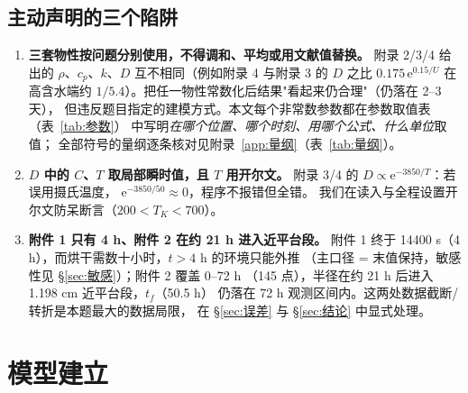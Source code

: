 \documentclass[12pt,a4paper]{ctexart}
\numberwithin{equation}{section}
\begin{document}
\subsection{主动声明的三个陷阱}
\begin{enumerate}
  \item \textbf{三套物性按问题分别使用，不得调和、平均或用文献值替换。}
        附录 2/3/4 给出的 $\rho$、$c_p$、$k$、$D$ 互不相同（例如附录 4 与附录 3 的
        $D$ 之比 $0.175\,\mathrm e^{0.15/U}$ 在高含水端约 $1/5.4$）。把任一物性常数化后结果"看起来仍合理"（仍落在 2--3 天），
        但违反题目指定的建模方式。本文每个非常数参数都在参数取值表（表~\ref{tab:参数}）
        中写明\emph{在哪个位置、哪个时刻、用哪个公式、什么单位}取值；
        全部符号的量纲逐条核对见附录~\ref{app:量纲}（表~\ref{tab:量纲}）。
  \item \textbf{$D$ 中的 $C$、$T$ 取局部瞬时值，且 $T$ 用开尔文。}
        附录 3/4 的 $D\propto\mathrm{e}^{-3850/T}$：若误用摄氏温度，
        $\mathrm{e}^{-3850/50}\approx0$，程序不报错但全错。
        我们在读入与全程设置开尔文防呆断言（$200<T_K<700$）。
  \item \textbf{附件 1 只有 4 h、附件 2 在约 21 h 进入近平台段。}
        附件 1 终于 14400 s（4 h），而烘干需数十小时，$t>4$ h 的环境只能外推
        （主口径 = 末值保持，敏感性见 \S\ref{sec:敏感}）；附件 2 覆盖 0--72 h
        （145 点），半径在约 21 h 后进入 1.198 cm 近平台段，$t_f$（50.5 h）
        仍落在 72 h 观测区间内。这两处数据截断/转折是本题最大的数据局限，
        在 \S\ref{sec:误差} 与 \S\ref{sec:结论} 中显式处理。
\end{enumerate}

\section{模型建立}\label{sec:模型}
\end{document}
